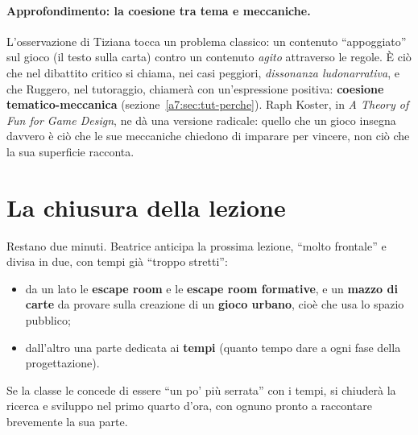 \paragraph{Approfondimento: la coesione tra tema e meccaniche.} L'osservazione di
Tiziana tocca un problema classico: un contenuto ``appoggiato'' sul gioco (il testo
sulla carta) contro un contenuto \emph{agito} attraverso le regole. È ciò che nel
dibattito critico si chiama, nei casi peggiori, \emph{dissonanza ludonarrativa}, e
che Ruggero, nel tutoraggio, chiamerà con un'espressione positiva:
\textbf{coesione tematico-meccanica} (sezione~\ref{a7:sec:tut-perche}). Raph Koster,
in \emph{A Theory of Fun for Game Design}, ne dà una versione radicale: quello che un
gioco insegna davvero è ciò che le sue meccaniche chiedono di imparare per vincere,
non ciò che la sua superficie racconta.

\section{La chiusura della lezione}
\label{a7:sec:chiusura}

Restano due minuti. Beatrice anticipa la prossima lezione, ``molto frontale'' e divisa
in due, con tempi già ``troppo stretti'':
\begin{itemize}
  \item da un lato le \textbf{escape room} e le \textbf{escape room formative}, e un
        \textbf{mazzo di carte} da provare sulla creazione di un \textbf{gioco
        urbano}, cioè che usa lo spazio pubblico;
  \item dall'altro una parte dedicata ai \textbf{tempi} (quanto tempo dare a ogni fase
        della progettazione).
\end{itemize}
Se la classe le concede di essere ``un po' più serrata'' con i tempi, si chiuderà la
ricerca e sviluppo nel primo quarto d'ora, con ognuno pronto a raccontare brevemente la
sua parte.

